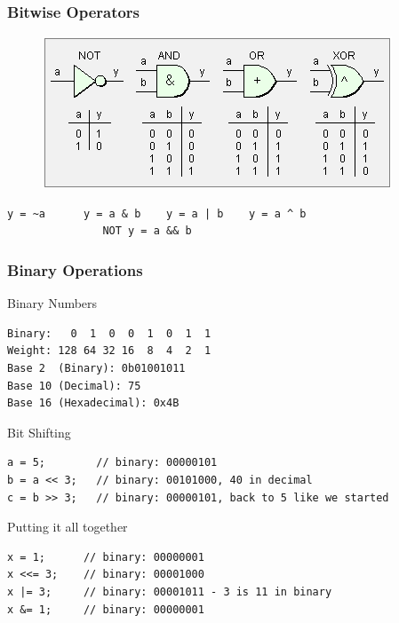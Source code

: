 \documentclass[t]{beamer}
\begin{document}
\begin{frame}[t,fragile]
\frametitle{Bitwise Operators}

\begin{figure}
	\includegraphics[scale=0.8]{truthTables.png}
\end{figure}

\begin{BVerbatim}[tabsize=1]
       y = ~a      y = a & b    y = a | b    y = a ^ b
               NOT y = a && b
\end{BVerbatim}

\end{frame}


\begin{frame}[t,fragile]
\frametitle{Binary Operations}
Binary Numbers\\
\begin{verbatim}
Binary:   0  1  0  0  1  0  1  1
Weight: 128 64 32 16  8  4  2  1
Base 2  (Binary): 0b01001011
Base 10 (Decimal): 75 
Base 16 (Hexadecimal): 0x4B
\end{verbatim}

\break
Bit Shifting\\
\begin{verbatim}
a = 5;        // binary: 00000101
b = a << 3;   // binary: 00101000, 40 in decimal
c = b >> 3;   // binary: 00000101, back to 5 like we started
\end{verbatim}
\break
Putting it all together\\
\begin{verbatim}
x = 1;      // binary: 00000001
x <<= 3;    // binary: 00001000
x |= 3;     // binary: 00001011 - 3 is 11 in binary
x &= 1;     // binary: 00000001
\end{verbatim}
\end{frame}




\end{document}
